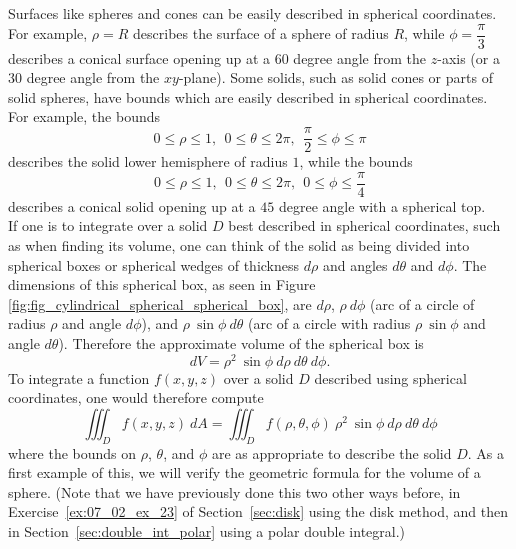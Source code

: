 Surfaces like spheres and cones can be easily described in spherical coordinates.  For example, $\rho = R$ describes the surface of a sphere of radius $R$, while $\phi = \dfrac{\pi}{3}$ describes a conical surface opening up at a $60$ degree angle from the $z$-axis (or a $30$ degree angle from the $xy$-plane). Some solids, such as solid cones or parts of solid spheres, have bounds which are easily described in spherical coordinates. For example, the bounds
$$0 \leq \rho \leq 1, \: \:  0 \leq \theta \leq 2\pi, \: \: \dfrac{\pi}{2} \leq \phi \leq \pi$$
describes the solid lower hemisphere of radius $1$, while the bounds
$$0 \leq \rho \leq 1, \: \:  0 \leq \theta \leq 2\pi, \: \: 0 \leq \phi \leq \dfrac{\pi}{4}$$
describes a conical solid opening up at a $45$ degree angle with a spherical top.\\

If one is to integrate over a solid $D$ best described in spherical coordinates, such as when finding its volume, one can think of the solid as being divided into spherical boxes or spherical wedges of thickness $d\rho$ and angles $d\theta$ and $d\phi$.  The dimensions of this spherical box, as seen in Figure \ref{fig:fig_cylindrical_spherical_spherical_box}, are $d\rho$, $\rho \: d\phi$ (arc of a circle of radius $\rho$ and angle $d\phi$), and $\rho \: \sin\phi \: d\theta$ (arc of a circle with radius $\rho \: \sin\phi$ and angle $d\theta$). Therefore the approximate volume of the spherical box is
$$dV = \rho^2 \: \sin\phi \: d\rho \: d\theta \: d\phi.$$
To integrate a function $f(x,y,z)$ over a solid $D$ described using spherical coordinates, one would therefore compute
$$\iiint_D f(x,y,z) \: dA = \iiint_D f(\rho,\theta,\phi) \: \rho^2 \: \sin\phi \: d\rho \: d\theta \: d\phi$$
where the bounds on $\rho$, $\theta$, and $\phi$ are as appropriate to describe the solid $D$. As a first example of this, we will verify the geometric formula for the volume of a sphere.  (Note that we have previously done this two other ways before, in Exercise~\ref{ex:07_02_ex_23} of Section~\ref{sec:disk} using the disk method, and then in Section~\ref{sec:double_int_polar} using a polar double integral.)\\

\\

